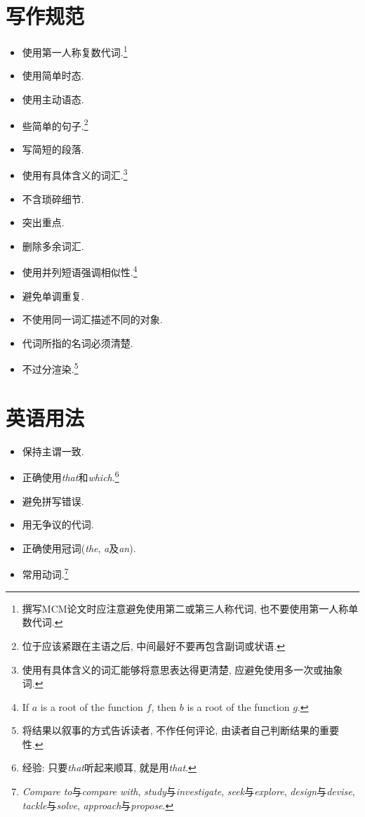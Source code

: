 \documentclass[openany]{ctexbook}
\begin{document}
    \section{写作规范}
    \begin{itemize}
        \item 使用第一人称复数代词.\footnote{撰写MCM论文时应注意避免使用第二或第三人称代词, 也不要使用第一人称单数代词.}
        \item 使用简单时态.
        \item 使用主动语态.
        \item 些简单的句子.\footnote{位于应该紧跟在主语之后, 中间最好不要再包含副词或状语.}
        \item 写简短的段落.
        \item 使用有具体含义的词汇.\footnote{使用有具体含义的词汇能够将意思表达得更清楚, 应避免使用多一次或抽象词.}
        \item 不含琐碎细节.
        \item 突出重点.
        \item 删除多余词汇.
        \item 使用并列短语强调相似性.\footnote{If $a$ is a root of the function $f$, then $b$ is a root of the function $g$.}
        \item 避免单调重复.
        \item 不使用同一词汇描述不同的对象.
        \item 代词所指的名词必须清楚.
        \item 不过分渲染.\footnote{将结果以叙事的方式告诉读者, 不作任何评论, 由读者自己判断结果的重要性.}
    \end{itemize}

    \section{英语用法}
    \begin{itemize}
        \item 保持主谓一致.
        \item 正确使用\emph{that}和\emph{which}.\footnote{经验: 只要\emph{that}听起来顺耳, 就是用\emph{that}.}
        \item 避免拼写错误.
        \item 用无争议的代词.
        \item 正确使用冠词(\emph{the}, \emph{a}及\emph{an}).
        \item 常用动词.\footnote{\emph{Compare to}与\emph{compare with}, \emph{study}与\emph{investigate}, \emph{seek}与\emph{explore}, \emph{design}与\emph{devise}, \emph{tackle}与\emph{solve}, \emph{approach}与\emph{propose}.}
    \end{itemize}
\end{document}
